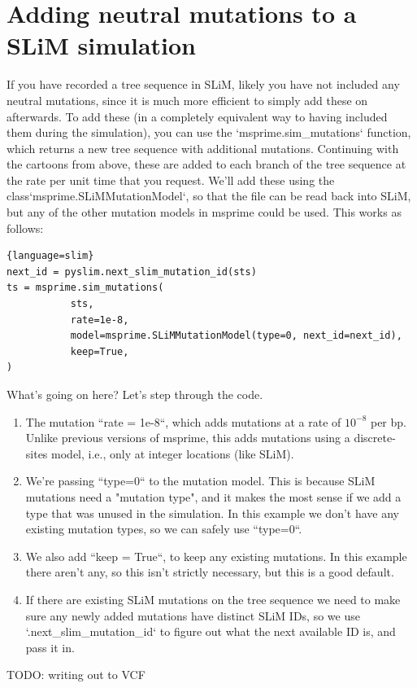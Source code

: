 \documentclass[12pt]{article}
\begin{document}
\section{Adding neutral mutations to a SLiM simulation}


If you have recorded a tree sequence in SLiM, likely you have not included any neutral mutations,
since it is much more efficient to simply add these on afterwards.
To add these (in a completely equivalent way to having included them during the simulation),
you can use the `msprime.sim\_mutations` function, which returns a new tree sequence with additional mutations.
Continuing with the cartoons from above, these are added to each branch of the tree sequence
at the rate per unit time that you request.
We'll add these using the {class}`msprime.SLiMMutationModel`, so that the file can be read back into SLiM,
but any of the other mutation models in msprime could be used.
This works as follows:
\begin{lstlisting}{language=slim}
next_id = pyslim.next_slim_mutation_id(sts)
ts = msprime.sim_mutations(
           sts,
           rate=1e-8,
           model=msprime.SLiMMutationModel(type=0, next_id=next_id),
           keep=True,
)
\end{lstlisting}


What's going on here? Let's step through the code.

\begin{enumerate}
    \item The mutation ``rate = 1e-8``, which adds mutations at a rate of $10^{-8}$ per bp.
    Unlike previous versions of msprime, this adds mutations using a discrete-sites model,
    i.e., only at integer locations (like SLiM).

\item We're passing ``type=0`` to the mutation model.
    This is because SLiM mutations need a "mutation type",
    and it makes the most sense if we add a type that was unused in the simulation.
    In this example we don't have any existing mutation types, so we can safely use ``type=0``.

\item We also add ``keep = True``, to keep any existing mutations.
    In this example there aren't any, so this isn't strictly necessary,
    but this is a good default.

\item If there are existing SLiM mutations on the tree sequence we need to
    make sure any newly added mutations have distinct SLiM IDs,
    so we use `.next\_slim\_mutation\_id` to figure out
    what the next available ID is, and pass it in.

\end{enumerate}

TODO: writing out to VCF
\end{document}
